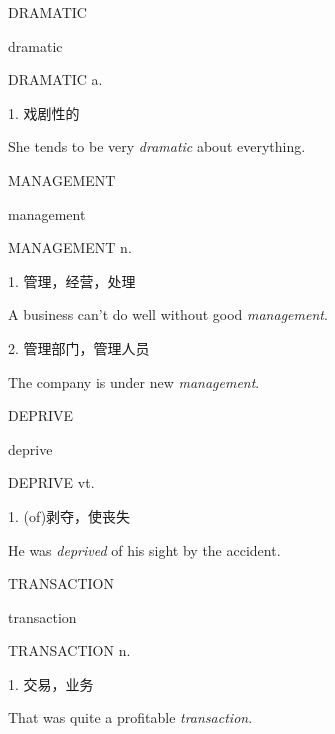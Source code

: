 \begin{flashcard}{
DRAMATIC

dramatic
}
\begin{center}
DRAMATIC a. 
\end{center}
1. 戏剧性的

She tends to be very \textit{dramatic} about everything.

\end{flashcard}
\begin{flashcard}{
MANAGEMENT

management
}
\begin{center}
MANAGEMENT n. 
\end{center}
1. 管理，经营，处理

A business can't do well without good \textit{management}.

2. 管理部门，管理人员

The company is under new \textit{management}.

\end{flashcard}
\begin{flashcard}{
DEPRIVE

deprive
}
\begin{center}
DEPRIVE vt. 
\end{center}
1. (of)剥夺，使丧失

He was \textit{deprived} of his sight by the accident.

\end{flashcard}
\begin{flashcard}{
TRANSACTION

transaction
}
\begin{center}
TRANSACTION n. 
\end{center}
1. 交易，业务

That was quite a profitable \textit{transaction}.

\end{flashcard}
